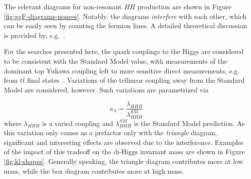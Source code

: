 The relevant diagrams for non-resonant $HH$ production are shown in Figure \ref{fig:ggF-diagrams-nonres}.
Notably, the diagrams \emph{interfere} with each other, which can be easily seen by counting the fermion lines. 
A detailed theoretical discussion is provided by, e.g.~\cite{Dawson-2015}.

For the searches presented here, the quark couplings to the Higgs are considered to be consistent with the Standard 
Model value, with measurements of the dominant top Yukawa coupling left to more sensitive direct measurements, e.g. from 
$t\bar{t}$ final states~\cite{top-Yukawa}. Variations of the trilinear coupling away from the Standard 
Model are considered, however. Such variations are parametrized via 

\begin{equation}
\kappa_{\lambda} = \frac{\lambda_{HHH}}{\lambda_{HHH}^{SM}}
\end{equation}
where $\lambda_{HHH}$ is a varied coupling and $\lambda_{HHH}^{SM}$ is the Standard Model prediction.
As this variation only comes as a prefactor only with the \emph{triangle} diagram, significant and interesting 
effects are observed due to the interference. Examples of the impact of this tradeoff on the di-Higgs invariant 
mass are shown in Figure \ref{fig:kl-shapes}. Generally speaking, the triangle diagram contributes more at low mass, 
while the box diagram contributes more at high mass. 

